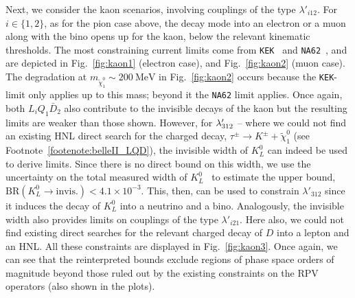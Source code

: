 Next, we consider the kaon scenarios, involving couplings of the type $\lambda'_{i12}$. For 
$i\in\{1,2\}$, as for the pion case above, the decay mode into an electron or a muon along 
with the bino opens up for the kaon, below the relevant kinematic thresholds. The most 
constraining current limits come from \texttt{KEK}~\cite{Asano:1981he, Hayano:1982wu} and 
\texttt{NA62}~\cite{NA62:2020mcv, NA62:2021bji}, and are depicted in Fig.~\ref{fig:kaon1} 
(electron case), and Fig.~\ref{fig:kaon2} (muon case).
The degradation at $m_{\tilde{\chi}^0_1}\sim \SI{200}{\MeV}$ in Fig.~\ref{fig:kaon2} occurs 
because the \texttt{KEK}-limit only applies up to this mass; beyond it the \texttt{NA62} 
limit applies. Once again, both $L_iQ_1\bar D_2$ also contribute to the invisible decays of the kaon but the 
resulting limits are weaker than those shown. However, for $\lambda'_{312}$ 
-- where we could not find an existing HNL direct search for the charged decay, $\tau^\pm \to 
K^\pm + \tilde{\chi}^0_1$ (see Footnote~\ref{footenote:belleII_LQD}), the invisible width of $K^0_L$ can indeed be used to derive limits. 
Since there is no direct bound on this width, we use the uncertainty on the total measured 
width of $K^0_L$~\cite{Workman:2022ynf} to estimate the upper bound, $\text{BR}(K^0_L \to 
\text{invis.}) < 4.1 \times 10^{-3}$. This, then, can be used to constrain $\lambda'_{312}$ 
since it induces the decay of $K^0_L$ into a neutrino and a bino. Analogously, the invisible 
width also provides limits on couplings of the type $\lambda'_{i21}$. Here also, we could 
not find existing direct searches for the relevant charged decay of $D$ into a lepton and 
an HNL. All these constraints are displayed in Fig.~\ref{fig:kaon3}. Once again, we can see 
that the reinterpreted bounds exclude regions of phase space orders of magnitude beyond 
those ruled out by the existing constraints on the RPV operators (also shown in the plots).

